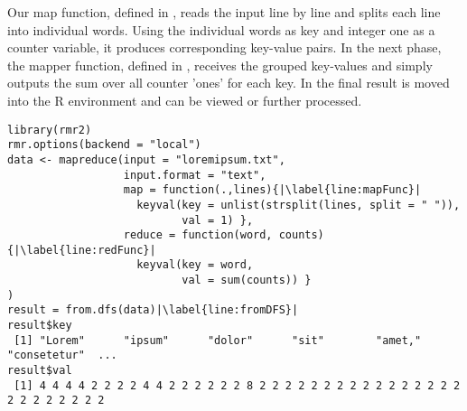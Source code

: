 Our map function, defined in , reads the input line by line and splits each line into individual words. Using the individual words as key and integer one as a counter variable, it produces corresponding key-value pairs. In the next phase, the mapper function, defined in , receives the grouped key-values and simply outputs the sum over all counter 'ones' for each key. In  the final result is moved into the R environment and can be viewed or further processed.

\begin{lstlisting}[breaklines=true, caption=Hello World example for MapReduce~\cite{usingRAndHadoop}., escapechar=|, label={lst:helloWorld}]
library(rmr2)
rmr.options(backend = "local")
data <- mapreduce(input = "loremipsum.txt", 
                  input.format = "text",
                  map = function(.,lines){|\label{line:mapFunc}|
                    keyval(key = unlist(strsplit(lines, split = " ")),
                           val = 1) },
                  reduce = function(word, counts){|\label{line:redFunc}|
                    keyval(key = word,
                           val = sum(counts)) }
)
result = from.dfs(data)|\label{line:fromDFS}|
result$key
 [1] "Lorem"      "ipsum"      "dolor"      "sit"        "amet,"      "consetetur"  ...
result$val
 [1] 4 4 4 4 2 2 2 2 4 4 2 2 2 2 2 2 8 2 2 2 2 2 2 2 2 2 2 2 2 2 2 2 2 2 2 2 2 2 2 2 2
\end{lstlisting}